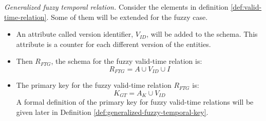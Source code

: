 \begin{definition}
\emph{Generalized fuzzy temporal relation.}
\label{def:fuzzy-temporal-relation}
Consider the elements in definition \ref{def:valid-time-relation}. Some of them will be extended for the fuzzy case.

\begin{itemize}
\item An attribute called version identifier, $V_{ID}$, will be added to the schema. This attribute is a counter for each different version of the entities. 



\item Then $R_{FTG}$, the schema for the fuzzy valid-time relation is:
\begin{equation}
 \label{eq:fuzzy-valid-time-relation}
R_{FTG} = A \cup V_{ID} \cup  I
\end{equation}
\item The primary key for the fuzzy valid-time relation $R_{FTG}$ is:
\begin{equation}
 \label{eq:fuzzy-valid-time-temporal-pk}
K_{GT} = A_K \cup V_{ID}
\end{equation}
A formal definition of the primary key for fuzzy valid-time relations will be given later in Definition \ref{def:generalized-fuzzy-temporal-key}.



\end{itemize}
\end{definition}
